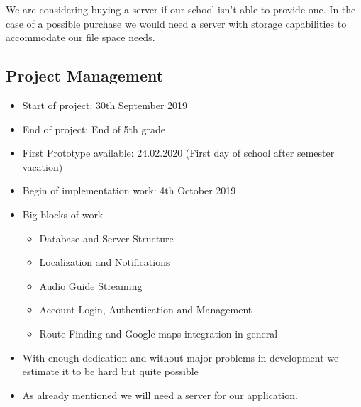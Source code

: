 \documentclass[12pt]{article}
\theoremstyle{definition}
\begin{document}
We are considering buying a server if our school isn't able to provide one. In the case of a possible purchase we would need a server with storage capabilities to accommodate our file space needs.

\subsection{Project Management}
\begin{itemize}
    \item Start of project: 30th September 2019
    \item End of project: End of 5th grade
    \newline
    \item First Prototype available: 24.02.2020 (First day of school after semester vacation)
    \item Begin of implementation work: 4th October 2019
    \newline
    \newline
    \item Big blocks of work
    \begin{itemize}
        \item Database and Server Structure
        \item Localization and Notifications
        \item Audio Guide Streaming
        \item Account Login, Authentication and Management
        \item Route Finding and Google maps integration in general
    \end{itemize}
    \newline
    \item With enough dedication and without major problems in development we estimate it to be hard but quite possible
    \item As already mentioned we will need a server for our application.
    
\end{itemize} 
\end{document}
